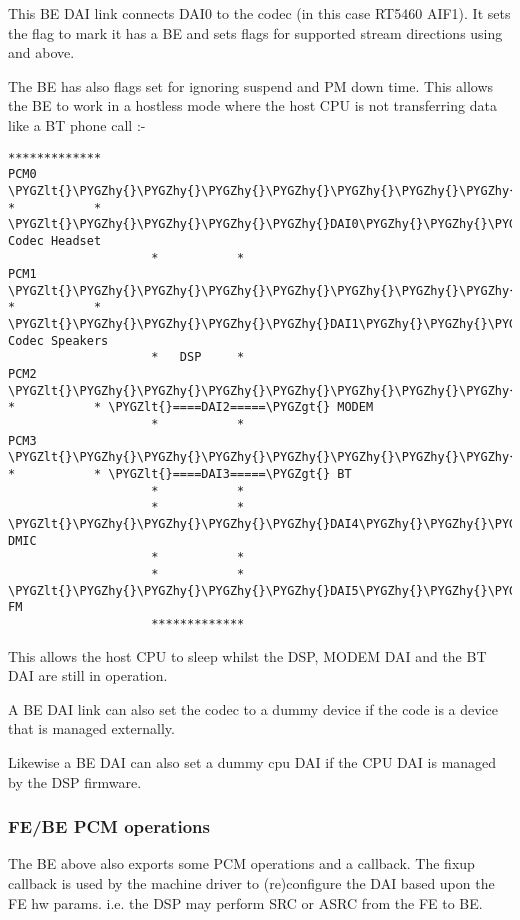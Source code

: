 \documentclass[a4paper,8pt,english]{sphinxmanual}
\def\PYGZlt{\char`\<}
\def\PYGZgt{\char`\>}
\def\PYGZhy{\char`\-}
\begin{document}
This BE DAI link connects DAI0 to the codec (in this case RT5460 AIF1). It sets
the  flag to mark it has a BE and sets flags for supported stream
directions using  and  above.

The BE has also flags set for ignoring suspend and PM down time. This allows
the BE to work in a hostless mode where the host CPU is not transferring data
like a BT phone call :-

\begin{Verbatim}[commandchars=\\\{\}]
                    *************
PCM0 \PYGZlt{}\PYGZhy{}\PYGZhy{}\PYGZhy{}\PYGZhy{}\PYGZhy{}\PYGZhy{}\PYGZhy{}\PYGZhy{}\PYGZhy{}\PYGZhy{}\PYGZhy{}\PYGZhy{}\PYGZgt{} *           * \PYGZlt{}\PYGZhy{}\PYGZhy{}\PYGZhy{}\PYGZhy{}DAI0\PYGZhy{}\PYGZhy{}\PYGZhy{}\PYGZhy{}\PYGZhy{}\PYGZgt{} Codec Headset
                    *           *
PCM1 \PYGZlt{}\PYGZhy{}\PYGZhy{}\PYGZhy{}\PYGZhy{}\PYGZhy{}\PYGZhy{}\PYGZhy{}\PYGZhy{}\PYGZhy{}\PYGZhy{}\PYGZhy{}\PYGZhy{}\PYGZgt{} *           * \PYGZlt{}\PYGZhy{}\PYGZhy{}\PYGZhy{}\PYGZhy{}DAI1\PYGZhy{}\PYGZhy{}\PYGZhy{}\PYGZhy{}\PYGZhy{}\PYGZgt{} Codec Speakers
                    *   DSP     *
PCM2 \PYGZlt{}\PYGZhy{}\PYGZhy{}\PYGZhy{}\PYGZhy{}\PYGZhy{}\PYGZhy{}\PYGZhy{}\PYGZhy{}\PYGZhy{}\PYGZhy{}\PYGZhy{}\PYGZhy{}\PYGZgt{} *           * \PYGZlt{}====DAI2=====\PYGZgt{} MODEM
                    *           *
PCM3 \PYGZlt{}\PYGZhy{}\PYGZhy{}\PYGZhy{}\PYGZhy{}\PYGZhy{}\PYGZhy{}\PYGZhy{}\PYGZhy{}\PYGZhy{}\PYGZhy{}\PYGZhy{}\PYGZhy{}\PYGZgt{} *           * \PYGZlt{}====DAI3=====\PYGZgt{} BT
                    *           *
                    *           * \PYGZlt{}\PYGZhy{}\PYGZhy{}\PYGZhy{}\PYGZhy{}DAI4\PYGZhy{}\PYGZhy{}\PYGZhy{}\PYGZhy{}\PYGZhy{}\PYGZgt{} DMIC
                    *           *
                    *           * \PYGZlt{}\PYGZhy{}\PYGZhy{}\PYGZhy{}\PYGZhy{}DAI5\PYGZhy{}\PYGZhy{}\PYGZhy{}\PYGZhy{}\PYGZhy{}\PYGZgt{} FM
                    *************
\end{Verbatim}

This allows the host CPU to sleep whilst the DSP, MODEM DAI and the BT DAI are
still in operation.

A BE DAI link can also set the codec to a dummy device if the code is a device
that is managed externally.

Likewise a BE DAI can also set a dummy cpu DAI if the CPU DAI is managed by the
DSP firmware.


\subsubsection{FE/BE PCM operations}
\label{sound/soc/dpcm:fe-be-pcm-operations}
The BE above also exports some PCM operations and a  callback. The fixup
callback is used by the machine driver to (re)configure the DAI based upon the
FE hw params. i.e. the DSP may perform SRC or ASRC from the FE to BE.
\end{document}
